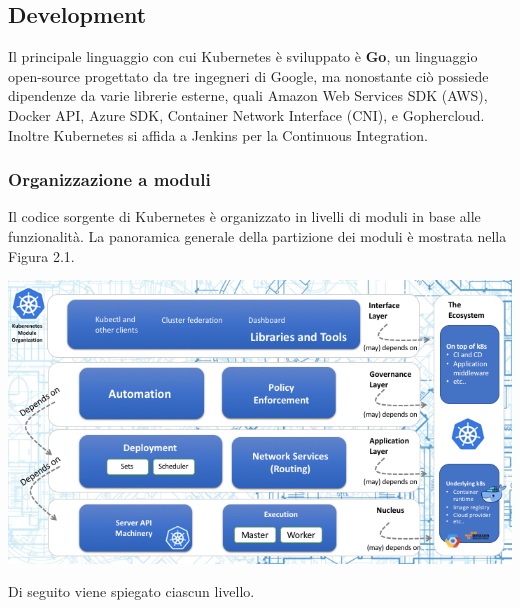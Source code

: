 \documentclass[12pt, a4paper]{report}
\begin{document}
\subsection{Development}
Il principale linguaggio con cui Kubernetes è sviluppato è \textbf{Go}, un linguaggio open-source progettato da tre ingegneri di Google, ma nonostante ciò possiede dipendenze da varie librerie esterne, quali Amazon Web Services SDK (AWS), Docker API, Azure SDK,  Container Network Interface (CNI), e Gophercloud. Inoltre Kubernetes si affida a Jenkins per la Continuous Integration.
\subsubsection{Organizzazione a moduli}
Il codice sorgente di Kubernetes è organizzato in livelli di moduli in base alle funzionalità. La panoramica generale della partizione dei moduli è mostrata nella Figura 2.1.\\
\begin{center}
  \includegraphics[width=\linewidth]{Images/Kubernetes-development}
\end{center}
\newpage
Di seguito viene spiegato ciascun livello.
\end{document}
